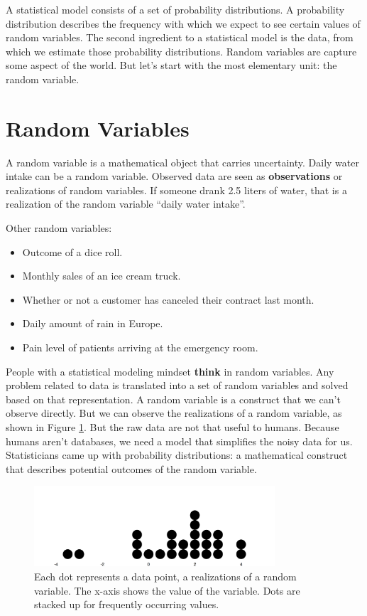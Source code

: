 \documentclass[
  10pt,
]{scrbook}
\providecommand{\tightlist}{%
  \setlength{\itemsep}{0pt}\setlength{\parskip}{0pt}}
\begin{document}
A statistical model consists of a set of probability distributions.
A probability distribution describes the frequency with which we expect to see certain values of random variables.
The second ingredient to a statistical model is the data, from which we estimate those probability distributions.
Random variables are capture some aspect of the world.
But let's start with the most elementary unit: the random variable.

\hypertarget{random-variables}{%
\section{Random Variables}\label{random-variables}}

A random variable is a mathematical object that carries uncertainty.
Daily water intake can be a random variable.
Observed data are seen as \textbf{observations} or realizations of random variables.
If someone drank 2.5 liters of water, that is a realization of the random variable ``daily water intake''.

Other random variables:

\begin{itemize}
\tightlist
\item
  Outcome of a dice roll.
\item
  Monthly sales of an ice cream truck.
\item
  Whether or not a customer has canceled their contract last month.
\item
  Daily amount of rain in Europe.
\item
  Pain level of patients arriving at the emergency room.
\end{itemize}

People with a statistical modeling mindset \textbf{think} in random variables.
Any problem related to data is translated into a set of random variables and solved based on that representation.
A random variable is a construct that we can't observe directly.
But we can observe the realizations of a random variable, as shown in Figure \ref{fig:variable}.
But the raw data are not that useful to humans.
Because humans aren't databases, we need a model that simplifies the noisy data for us.
Statisticians came up with probability distributions: a mathematical construct that describes potential outcomes of the random variable.

\begin{figure}

{\centering \includegraphics[width=0.8\textwidth]{figures/variable-1} 

}

\caption{Each dot represents a data point, a realizations of a random variable. The x-axis shows the value of the variable. Dots are stacked up for frequently occurring values. }\label{fig:variable}
\end{figure}
\end{document}
